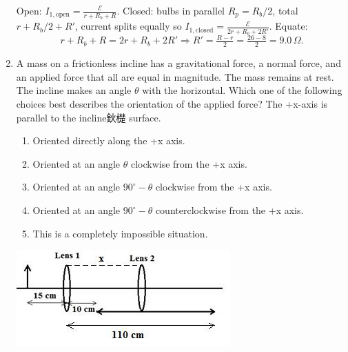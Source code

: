 ﻿\documentclass[12pt, a4paper]{article}
\begin{document}
\begin{CJK*}{UTF8}{gbsn}
\begin{enumerate}[itemsep=1.0em, topsep=0.6em]
\begin{solutionbox}
Open: $I_{1,\text{open}}=\tfrac{\mathcal E}{r+R_b+R}$. Closed: bulbs in parallel $R_p=R_b/2$, total $r+R_b/2+R'$, current splits equally so $I_{1,\text{closed}}=\tfrac{\mathcal E}{2r+R_b+2R'}$. Equate:
\[
r+R_b+R=2r+R_b+2R' \Rightarrow R' = \tfrac{R-r}{2} = \tfrac{26-8}{2}=9.0\,\Omega.
\]
\end{solutionbox}

\newpage

\item \label{prob:23}
\noindent\begin{minipage}[t]{0.6\linewidth}
\vspace{0pt}
A mass on a frictionless incline has a gravitational force, a normal force, and an applied force that all are equal in magnitude. The mass remains at rest. The incline makes an angle $\theta$ with the horizontal. Which one of the following choices best describes the orientation of the applied force? The +x-axis is parallel to the incline鈥檚 surface.
\begin{enumerate}[label=(\Alph*)]
    \item Oriented directly along the +x axis.
    \item Oriented at an angle $\theta$ clockwise from the +x axis.
    \item Oriented at an angle $90^\circ - \theta$ clockwise from the +x axis.
    \item Oriented at an angle $90^\circ - \theta$ counterclockwise from the +x axis.
    \item This is a completely impossible situation.
\end{enumerate}
\end{minipage}%
\hfill
\begin{minipage}[t]{0.32\linewidth}
\vspace{0pt}
\centering
\includegraphics[width=\linewidth]{Problem_24_Figure.png}
\end{minipage}


\end{enumerate}
\end{CJK*}
\end{document}
